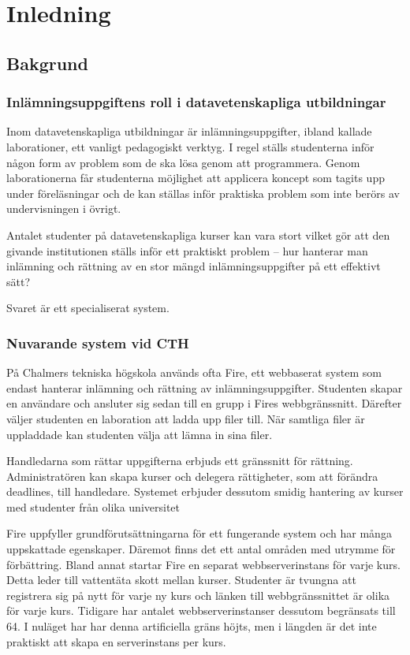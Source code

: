 \chapter{Inledning}

\section{Bakgrund}

\subsection{Inlämningsuppgiftens roll i datavetenskapliga utbildningar}

Inom datavetenskapliga utbildningar är inlämningsuppgifter, ibland kallade laborationer, ett vanligt pedagogiskt verktyg. I regel ställs studenterna inför någon form av problem som de ska lösa genom att programmera. Genom laborationerna får studenterna möjlighet att applicera koncept som tagits upp under föreläsningar och de kan ställas inför praktiska problem som inte berörs av undervisningen i övrigt. 

Antalet studenter på datavetenskapliga kurser kan vara stort vilket gör att den givande institutionen ställs inför ett praktiskt problem – hur hanterar man inlämning och rättning av en stor mängd inlämningsuppgifter på ett effektivt sätt?

Svaret är ett specialiserat system.

\subsection{Nuvarande system vid CTH}

På Chalmers tekniska högskola används ofta Fire, ett webbaserat system som endast hanterar inlämning och rättning av inlämningsuppgifter.
Studenten skapar en användare och ansluter sig sedan till en grupp i Fires webbgränssnitt. Därefter väljer studenten en laboration att ladda upp filer till. När samtliga filer är uppladdade kan studenten välja att lämna in sina filer. 

Handledarna som rättar uppgifterna erbjuds ett gränssnitt för rättning. Administratören kan skapa kurser och delegera rättigheter, som att förändra deadlines, till handledare. Systemet erbjuder dessutom smidig hantering av kurser med studenter från olika universitet

Fire uppfyller grundförutsättningarna för ett fungerande system och har många uppskattade egenskaper.
Däremot finns det ett antal områden med utrymme för förbättring. Bland annat startar Fire en separat webbserverinstans för varje kurs. Detta leder till vattentäta skott mellan kurser. Studenter är tvungna att registrera sig på nytt för varje ny kurs och länken till webbgränssnittet är olika för varje kurs. Tidigare har antalet webbserverinstanser dessutom begränsats till 64. I nuläget har har denna artificiella gräns höjts, men i längden är det inte praktiskt att skapa en serverinstans per kurs.

